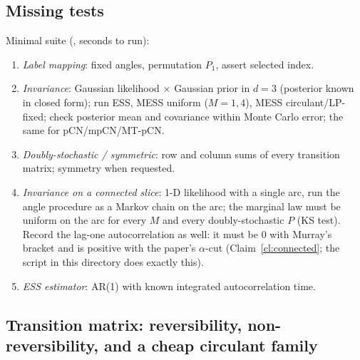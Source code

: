 \documentclass[11pt,a4paper]{article}
\theoremstyle{remark}
\begin{document}
\subsection{Missing tests}\label{sec:tests}
Minimal suite (, seconds to run):
\begin{enumerate}[leftmargin=*]
\item \emph{Label mapping}: fixed angles, permutation $P_1$, assert selected index.
\item \emph{Invariance}: Gaussian likelihood $\times$ Gaussian prior in $d=3$ (posterior known in closed form); run ESS, MESS uniform ($M=1,4$), MESS circulant/LP-fixed; check posterior mean and covariance within Monte Carlo error; the same for pCN/mpCN/MT-pCN.
\item \emph{Doubly-stochastic / symmetric}: row and column sums of every transition matrix; symmetry when requested.
\item \emph{Invariance on a connected slice}: 1-D likelihood with a single arc, run the angle procedure as a Markov chain on the arc; the marginal law must be uniform on the arc for every $M$ and every doubly-stochastic $P$ (KS test). Record the lag-one autocorrelation as well: it must be $0$ with Murray's bracket and is positive with the paper's $\alpha$-cut (Claim~\ref{cl:connected}; the script  in this directory does exactly this).
\item \emph{ESS estimator}: AR(1) with known integrated autocorrelation time.
\end{enumerate}

\subsection{Transition matrix: reversibility, non-reversibility, and a cheap circulant family}\label{sec:circulant}
\end{document}
